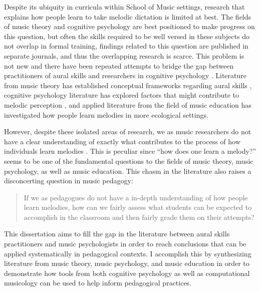 \documentclass[12pt,]{book}
\begin{document}
Despite its ubiquity in curricula within School of Music settings, research that explains how people learn to take melodic dictation is limited at best.
The fields of music theory and cognitive psychology are best positioned to make progress on this question, but often the skills required to be well versed in these subjects do not overlap in formal training, findings related to this question are published in separate journals, and thus the overlapping research is scarce.
This problem is not new and there have been repeated attempts to bridge the gap between practitioners of aural skills and researchers in cognitive psychology \citep{butlerBridgesUnbuiltComparing1993, davidbutlerWhyGulfMusic1997a, klonoskiImprovingDictationAuralSkills2006, klonoskiPerceptualLearningHierarchy2000, pembrookSendHelpAural1990, karpinskiAuralSkillsAcquisition2000}.
Literature from music theory has established conceptual frameworks regarding aural skills \citep{karpinskiAuralSkillsAcquisition2000}, cognitive psychology literature has explored factors that might contribute to melodic perception \citep{dowlingExpectancyAttentionMelody1990, dowlingScaleContourTwo1978, dowlingTonalStrengthMelody1991, halpernMemoryMelodies2010}, and applied literature from the field of music education \citep{buonviriEffectsTwoListening2017, buonviriMelodicDictationInstruction2015, paneyEffectDirectingAttention2016} has investigated how people learn melodies in more ecological settings.

However, despite these isolated areas of research, we as music researchers do not have a clear understanding of exactly what contributes to the process of how individuals learn melodies \citep{halpernMemoryMelodies2010}.
This is peculiar since ``how does one learn a melody?'' seems to be one of the fundamental questions to the fields of music theory, music psychology, as well as music education.
This chasm in the literature also raises a disconcerting question in music pedagogy:

\begin{quote}
If we as pedagogues do not have a in-depth understanding of how people learn melodies, how can we fairly assess what students can be expected to accomplish in the classroom and then fairly grade them on their attempts?
\end{quote}

This dissertation aims to fill the gap in the literature between aural skills practitioners and music psychologists in order to reach conclusions that can be applied systematically in pedagogical contexts.
I accomplish this by synthesizing literature from music theory, music psychology, and music education in order to demonstrate how tools from both cognitive psychology as well as computational musicology can be used to help inform pedagogical practices.
\end{document}
